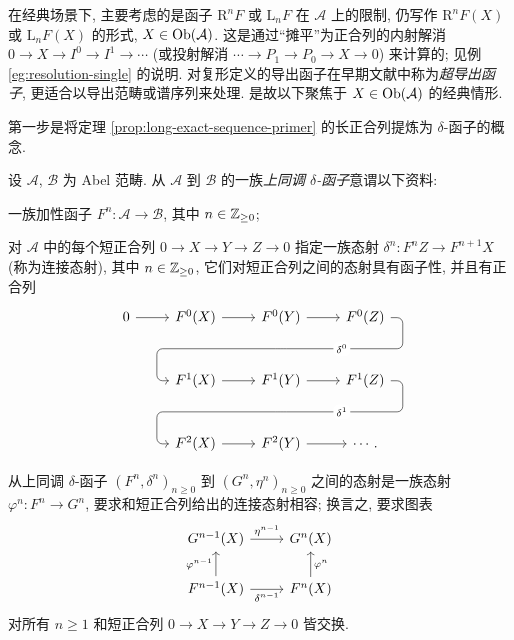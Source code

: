 在经典场景下, 主要考虑的是函子 $\mathrm{R}^n F$ 或 $\mathrm{L}_n F$ 在 $\mathcal{A}$ 上的限制, 仍写作 $\mathrm{R}^n F(X)$ 或 $\mathrm{L}_n F(X)$ 的形式, $X \in \operatorname{Ob}(\mathcal{A})$. 这是通过``摊平''为正合列的内射解消 $0 \to X \to I^0 \to I^1 \to \cdots$ (或投射解消 $\cdots \to P_1 \to P_0 \to X \to 0$) 来计算的; 见例 \ref{eg:resolution-single} 的说明. 对复形定义的导出函子在早期文献中称为\emph{超导出函子}, 更适合以导出范畴或谱序列来处理. 是故以下聚焦于 $X \in \operatorname{Ob}(\mathcal{A})$ 的经典情形.

第一步是将定理 \ref{prop:long-exact-sequence-primer} 的长正合列提炼为 $\delta$-函子的概念.

\begin{definition}\label{def:delta-functor}
	设 $\mathcal{A}$, $\mathcal{B}$ 为 Abel 范畴. 从 $\mathcal{A}$ 到 $\mathcal{B}$ 的一族\emph{上同调 $\delta$-函子}意谓以下资料:
	\begin{compactitem}
		\item 一族加性函子 $F^n: \mathcal{A} \to \mathcal{B}$, 其中 $n \in \mathbb{Z}_{\geq 0}$;
		\item 对 $\mathcal{A}$ 中的每个短正合列 $0 \to X \to Y \to Z \to 0$ 指定一族态射 $\delta^n: F^n Z \to F^{n+1} X$ (称为连接态射), 其中 $n \in \mathbb{Z}_{\geq 0}$, 它们对短正合列之间的态射具有函子性, 并且有正合列
		\begin{equation*}\begin{tikzcd}[row sep=large]
			0 \arrow[r] & F^0(X) \arrow[r] & F^0(Y) \arrow[r] \arrow[phantom, d, ""{coordinate, name=A}] & F^0(Z) \arrow[dll, rounded corners, "{\delta^0}" description, to path={
				-- ([xshift=2ex]\tikztostart.east)
				|- (A) [near end]\tikztonodes
				-| ([xshift=-2ex]\tikztotarget.west)
				-- (\tikztotarget)}] \\
			& F^1(X) \arrow[r] & F^1(Y) \arrow[r] \arrow[phantom, d, ""{coordinate, name=B}] & F^1(Z) \arrow[dll, rounded corners, "{\delta^1}" description, to path={
				-- ([xshift=2ex]\tikztostart.east)
				|- (B) [near end]\tikztonodes
				-| ([xshift=-2ex]\tikztotarget.west)
				-- (\tikztotarget)}] \\
			& F^2(X) \arrow[r] & F^2(Y) \arrow[r] & \cdots .
		\end{tikzcd}\end{equation*}
	\end{compactitem}
	从上同调 $\delta$-函子 $(F^n, \delta^n)_{n \geq 0}$ 到 $(G^n, \eta^n)_{n \geq 0}$ 之间的态射是一族态射 $\varphi^n: F^n \to G^n$, 要求和短正合列给出的连接态射相容; 换言之, 要求图表
	\[\begin{tikzcd}
		G^{n-1} (X) \arrow[r, "{\eta^{n-1}}"] & G^n (X) \\
		F^{n-1} (X) \arrow[r, "{\delta^{n-1}}"'] \arrow[u, "{\varphi^{n-1}}"] & F^n (X) \arrow[u, "\varphi^n"']
	\end{tikzcd}\]
	对所有 $n \geq 1$ 和短正合列 $0 \to X \to Y \to Z \to 0$ 皆交换.
	

\end{definition}
